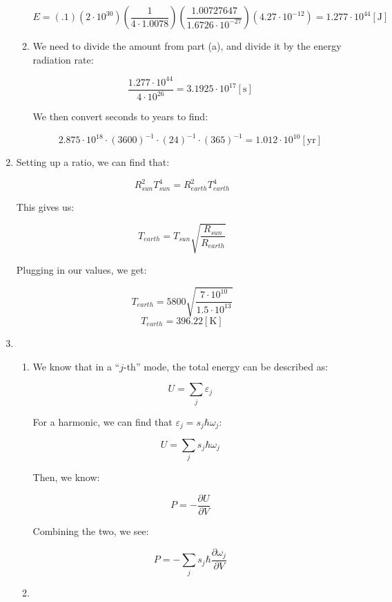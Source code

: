 \begin{enumerate}
\begin{enumerate}
        $$\boxed{E=(.1)(2\cdot10^{30})\left( \frac{1}{4\cdot 1.0078} \right)\left( \frac{1.00727647}{1.6726\cdot10^{-27}} \right)(4.27\cdot10^{-12})=1.277\cdot10^{44}[\si{\joule}]}$$

      \item 

        We need to divide the amount from part (a), and divide it by the energy radiation rate:

        $$\frac{1.277\cdot10^{44}}{4\cdot10^{26}}=3.1925\cdot10^{17}[\si{\second}]$$

        We then convert seconds to years to find:

        $$\boxed{2.875\cdot10^{18}\cdot(3600)^{-1}\cdot(24)^{-1}\cdot(365)^{-1}=1.012\cdot10^{10}[\text{yr}]}$$

    \end{enumerate}

  \item

    Setting up a ratio, we can find that:

    $$R^2_{sun}T^4_{sun}=R^2_{earth}T^4_{earth}$$

    This gives us:

    $$T_{earth}=T_{sun}\sqrt{\frac{R_{sun}}{R_{earth}}}$$

    Plugging in our values, we get:

    $$T_{earth}=5800\sqrt{\frac{7\cdot10^{10}}{1.5\cdot10^{13}}}$$
    $$\boxed{T_{earth}=396.22[\si{\kelvin}]}$$

  \item

    \begin{enumerate}

      \item 

        We know that in a ``$j$-th'' mode, the total energy can be described as:

        $$U=\sum_j \varepsilon_j$$

        For a harmonic, we can find that $\varepsilon_j=s_j\hbar\omega_j$:

        $$U=\sum_j s_j\hbar\omega_j$$

        Then, we know:

        $$P=-\frac{\partial U}{\partial V}$$

        Combining the two, we see:

        $$\boxed{P=-\sum_js_j\hbar\frac{\partial\omega_j}{\partial V}}$$

      \item 


\end{enumerate}
\end{enumerate}

